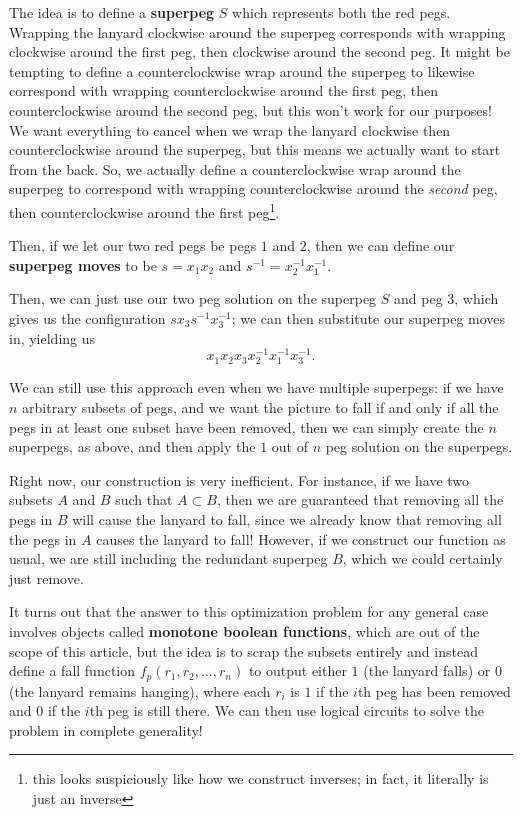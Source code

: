 \documentclass{article}
\begin{document}
\begin{multicols}{3}
The idea is to define a \textbf{superpeg} $S$ which represents both the red pegs. Wrapping the lanyard clockwise around the superpeg corresponds with wrapping clockwise around the first peg, then clockwise around the second peg. It might be tempting to define a counterclockwise wrap around the superpeg to likewise correspond with wrapping counterclockwise around the first peg, then counterclockwise around the second peg, but this won’t work for our purposes! We want everything to cancel when we wrap the lanyard clockwise then counterclockwise around the superpeg, but this means we actually want to start from the back. So, we actually define a counterclockwise wrap around the superpeg to correspond with wrapping counterclockwise around the \textit{second} peg, then counterclockwise around the first peg\footnote{this looks suspiciously like how we construct inverses; in fact, it literally is just an inverse}. 

Then, if we let our two red pegs be pegs $1$ and $2$, then we can define our \textbf{superpeg moves} to be $s=x_1x_2$ and $s^{-1}=x_2^{-1}x_1^{-1}$. 

Then, we can just use our two peg solution on the superpeg $S$ and peg $3$, which gives us the configuration $sx_3s^{-1}x_3^{-1}$; we can then substitute our superpeg moves in, yielding us 
\[x_1x_2x_3x_2^{-1}x_1^{-1}x_3^{-1}.\]

We can still use this approach even when we have multiple superpegs: if we have $n$ arbitrary subsets of pegs, and we want the picture to fall if and only if all the pegs in at least one subset have been removed, then we can simply create the $n$ superpegs, as above, and then apply the $1$ out of $n$ peg solution on the superpegs. 

Right now, our construction is very inefficient. For instance, if we have two subsets $A$ and $B$ such that $A\subset B$, then we are guaranteed that removing all the pegs in $B$ will cause the lanyard to fall, since we already know that removing all the pegs in $A$ causes the lanyard to fall! However, if we construct our function as usual, we are still including the redundant superpeg $B$, which we could certainly just remove. 

It turns out that the answer to this optimization problem for any general case involves objects called \textbf{monotone boolean functions}, which are out of the scope of this article, but the idea is to scrap the subsets entirely and instead define a fall function $f_p(r_1,r_2,\dots,r_n)$ to output either $1$ (the lanyard falls) or $0$ (the lanyard remains hanging), where each $r_i$ is $1$ if the $i$th peg has been removed and $0$ if the $i$th peg is still there. We can then use logical circuits to solve the problem in complete generality! 


\end{multicols}
\end{document}
